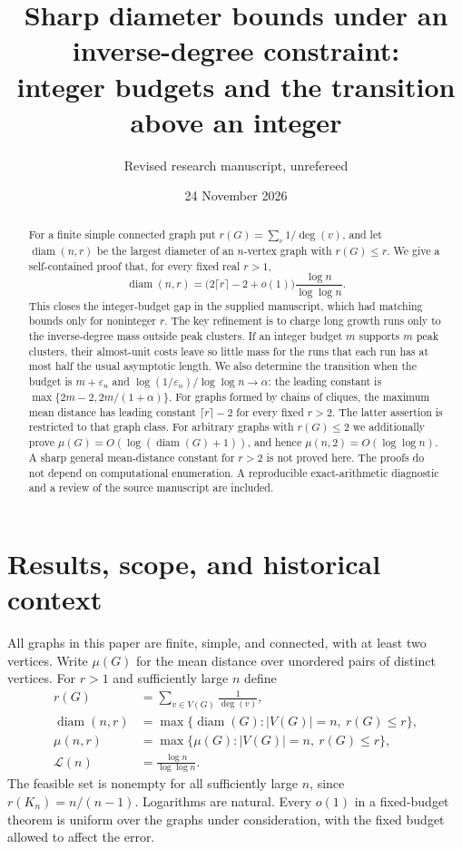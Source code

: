 \documentclass[11pt]{amsart}
\title[Sharp diameter under an inverse-degree constraint]{Sharp diameter bounds under an inverse-degree constraint:\\
integer budgets and the transition above an integer}
\author{Revised research manuscript, unrefereed}
\date{24 November 2026}
\theoremstyle{definition}
\theoremstyle{remark}
\newcommand{\diam}{\operatorname{diam}}
\newcommand{\Lz}{\mathcal{L}}
\begin{document}
\begin{abstract}
For a finite simple connected graph put $r(G)=\sum_v1/\deg(v)$, and let
$\diam(n,r)$ be the largest diameter of an $n$-vertex graph with $r(G)\le r$.
We give a self-contained proof that, for every fixed real $r>1$,
\[
 \diam(n,r)=\bigl(2\lceil r\rceil-2+o(1)\bigr)
             \frac{\log n}{\log\log n}.
\]
This closes the integer-budget gap in the supplied manuscript, which had
matching bounds only for noninteger $r$. The key refinement is to charge
long growth runs only to the inverse-degree mass outside peak clusters.
If an integer budget $m$ supports $m$ peak clusters, their almost-unit costs
leave so little mass for the runs that each run has at most half the usual
asymptotic length. We also determine the transition when the budget is
$m+\varepsilon_n$ and $\log(1/\varepsilon_n)/\log\log n\to\alpha$:
the leading constant is $\max\{2m-2,2m/(1+\alpha)\}$.
For graphs formed by chains of cliques, the maximum mean distance has
leading constant $\lceil r\rceil-2$ for every fixed $r>2$.
The latter assertion is restricted to that graph class. For arbitrary graphs
with $r(G)\le2$ we additionally prove $\mu(G)=O(\log(\diam(G)+1))$,
and hence $\mu(n,2)=O(\log\log n)$.
A sharp general mean-distance constant for $r>2$ is not proved here. The proofs do not depend
on computational enumeration. A reproducible exact-arithmetic diagnostic
and a review of the source manuscript are included.
\end{abstract}
\maketitle

\section{Results, scope, and historical context}
All graphs in this paper are finite, simple, and connected, with at least
two vertices. Write $\mu(G)$ for the mean distance over unordered pairs of
distinct vertices. For $r>1$ and sufficiently large $n$ define
\begin{align*}
 r(G)&=\sum_{v\in V(G)}\frac1{\deg(v)},\\
 \diam(n,r)&=\max\{\diam(G): |V(G)|=n,\ r(G)\le r\},\\
 \mu(n,r)&=\max\{\mu(G): |V(G)|=n,\ r(G)\le r\},\\
 \Lz(n)&=\frac{\log n}{\log\log n}.
\end{align*}
The feasible set is nonempty for all sufficiently large $n$, since
$r(K_n)=n/(n-1)$. Logarithms are natural. Every $o(1)$ in a fixed-budget
theorem is uniform over the graphs under consideration, with the fixed
budget allowed to affect the error.
\end{document}
